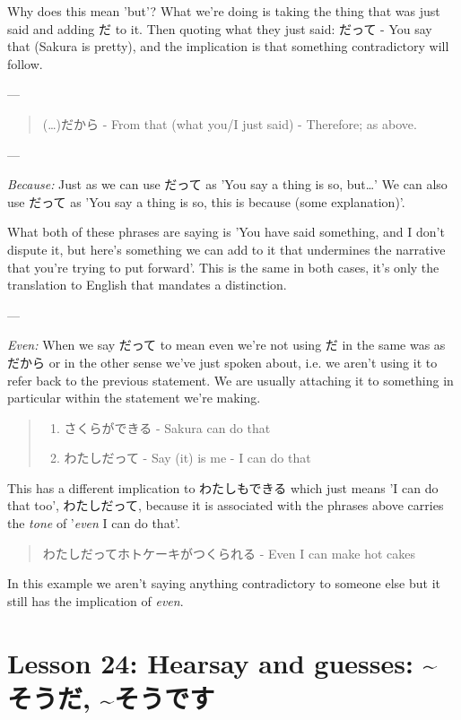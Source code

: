 \documentclass[11pt]{article}
\begin{document}
Why does this mean 'but'? What we're doing is taking the thing that was just said and adding だ to it. Then quoting what they just said: だって - You say that (Sakura is pretty), and the implication is that something contradictory will follow.

---

\begin{quote}
(\ldots{})だから - From that (what you/I just said) - Therefore; as above.
\end{quote}


---

\emph{Because:} Just as we can use だって as 'You say a thing is so, but\ldots{}' We can also use だって as 'You say a thing is so, this is because (some explanation)'.

What both of these phrases are saying is 'You have said something, and I don't dispute it, but here's something we can add to it that undermines the narrative that you're trying to put forward'. This is the same in both cases, it's only the translation to English that mandates a distinction.

---

\emph{Even:}
When we say だって to mean even we're not using だ in the same was as だから or in the other sense we've just spoken about, i.e. we aren't using it to refer back to the previous statement. We are usually attaching it to something in particular within the statement we're making.
\begin{quote}
\begin{enumerate}
\item さくらができる - Sakura can do that
\item わたしだって - Say (it) is me - I can do that
\end{enumerate}
\end{quote}
This has a different implication to わたしもできる which just means 'I can do that too', わたしだって, because it is associated with the phrases above carries the \emph{tone} of '\emph{even} I can do that'.

\begin{quote}
わたしだってホトケーキがつくられる - Even I can make hot cakes
\end{quote}
In this example we aren't saying anything contradictory to someone else but it still has the implication of \emph{even}.
\section{Lesson 24: Hearsay and guesses: \textasciitilde{}そうだ, \textasciitilde{}そうです}
\label{sec:orgd79868a}
\end{document}
